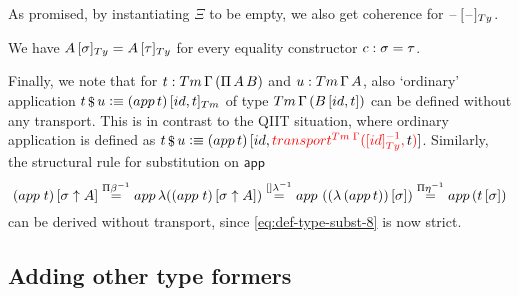 \documentclass[a4paper,UKenglish,numberwithinsect,cleveref,thm-restate]{lipics-v2021}
\newcommand{\danger}{\marginpar[\hfill\dbend]{\dbend\hfill}}
\begin{document}
As promised, by instantiating $\Xi$ to be empty, we also get coherence for $\subTy{\blank}{\blank}$.

\begin{corollary}
  We have $\subTy{A}{\sigma} = \subTy{A}{\tau}$ for every equality constructor $\cc : \sigma = \tau$.
  \danger
\end{corollary}

Finally, we note that for $t : \Tm\,\Gamma\,(\Pi\,A\,B)$ and $u : \Tm\,\Gamma\,A$, also `ordinary' application
$t \mathop{\$} u \defeq \subTm{(\mathsf{app}\,t)}{\idS , t}$ of type $\Tm\,\Gamma\,(\sub{B}{\idS , t})$ can be defined without any transport. This is in contrast to the QIIT situation, where ordinary application is defined as $t \mathop{\$} u \defeq \sub{(\mathsf{app}\,t)}{\idS, \alert{\transfib{\Tm\;\Gamma}{[\idS]_{\Ty}^{-1}}{\color{black}t}}}$.
%
Similarly, the structural rule for substitution on $\mathsf{app}$
\[
  \sub{(\mathsf{app}\;t)}{\sigma \uparrow A} \overset{\Pi\beta^{-1}}{=}
  \mathsf{app}\,\lambda(\sub{(\mathsf{app}\;t)}{\sigma \uparrow A}) \overset{[]\lambda^{-1}}{=}
  \mathsf{app}\,\left(\sub{(\lambda\,(\mathsf{app}\,t))}{\sigma}\right) \overset{\Pi\eta^{-1}}{=}
  \mathsf{app}\,(\sub{t}{\sigma})
\]
can be derived without transport, since \eqref{eq:def-type-subst-8} is now strict.

\subsection{Adding other type formers} \label{subsec:SC+U+Pi+more}
\end{document}
